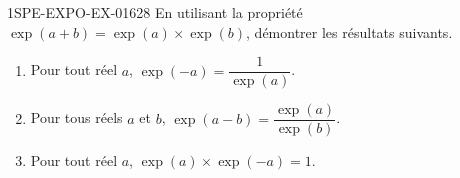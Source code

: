 \begin{exercice}{1SPE-EXPO-EX-016}{2}{8}
En utilisant la propriété $\exp(a+b) = \exp(a) \times \exp(b)$, démontrer les résultats suivants.
\begin{enumerate}
  \item Pour tout réel $a$, $\exp(-a) = \dfrac{1}{\exp(a)}$.
  \item Pour tous réels $a$ et $b$, $\exp(a-b) = \dfrac{\exp(a)}{\exp(b)}$.
  \item Pour tout réel $a$, $\exp(a) \times \exp(-a) = 1$.
\end{enumerate}
\end{exercice}
